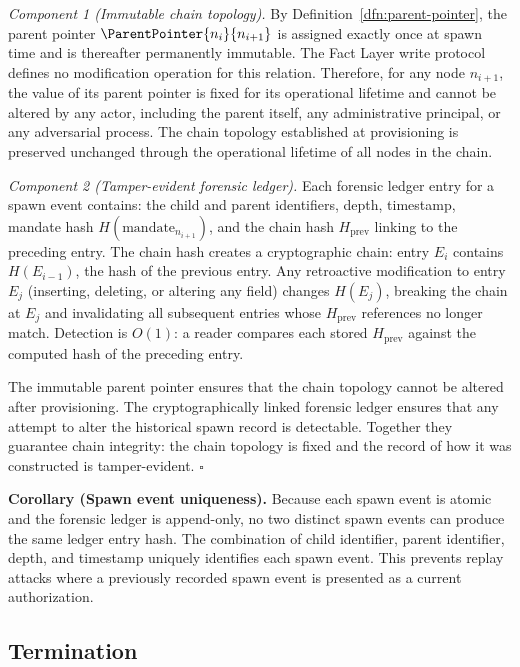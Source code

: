 \medskip
\textit{Component 1 (Immutable chain topology).} By Definition~\ref{dfn:parent-pointer}, the parent pointer $\ParentPointer{n_i}{n_{i+1}}$ is assigned exactly once at spawn time and is thereafter permanently immutable. The Fact Layer write protocol defines no modification operation for this relation. Therefore, for any node $n_{i+1}$, the value of its parent pointer is fixed for its operational lifetime and cannot be altered by any actor, including the parent itself, any administrative principal, or any adversarial process. The chain topology established at provisioning is preserved unchanged through the operational lifetime of all nodes in the chain.

\medskip
\textit{Component 2 (Tamper-evident forensic ledger).} Each forensic ledger entry for a spawn event contains: the child and parent identifiers, depth, timestamp, mandate hash $H(\text{mandate}_{n_{i+1}})$, and the chain hash $H_{\mathrm{prev}}$ linking to the preceding entry. The chain hash creates a cryptographic chain: entry $E_i$ contains $H(E_{i-1})$, the hash of the previous entry. Any retroactive modification to entry $E_j$ (inserting, deleting, or altering any field) changes $H(E_j)$, breaking the chain at $E_j$ and invalidating all subsequent entries whose $H_{\mathrm{prev}}$ references no longer match. Detection is $O(1)$: a reader compares each stored $H_{\mathrm{prev}}$ against the computed hash of the preceding entry.

The immutable parent pointer ensures that the chain topology cannot be altered after provisioning. The cryptographically linked forensic ledger ensures that any attempt to alter the historical spawn record is detectable. Together they guarantee chain integrity: the chain topology is fixed and the record of how it was constructed is tamper-evident. $\square$

\medskip
\noindent\textbf{Corollary (Spawn event uniqueness).} Because each spawn event is atomic and the forensic ledger is append-only, no two distinct spawn events can produce the same ledger entry hash. The combination of child identifier, parent identifier, depth, and timestamp uniquely identifies each spawn event. This prevents replay attacks where a previously recorded spawn event is presented as a current authorization.

\subsection{Termination}
\label{sec:termination}

